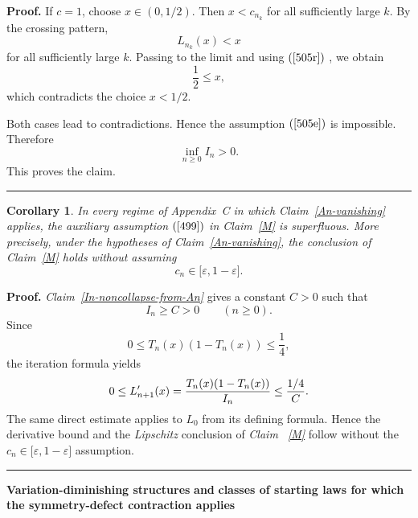\documentclass[onecolumn]{article}
\newtheorem{corollary}[theorem]{Corollary}
\newenvironment{proof}[1][Proof]{\noindent\textbf{#1.} }{\ \rule{0.5em}{0.5em}}
\begin{document}
\begin{proof}
\noindent If $c=1$, choose $x\in (0,1/2)$. Then $x<c_{n_{k}}$ for all
sufficiently large $k$. By the crossing pattern, 
\begin{equation*}
L_{n_{k}}(x)<x
\end{equation*}%
for all sufficiently large $k$. Passing to the limit and using $(\ref{505r})$%
, we obtain 
\begin{equation*}
\frac{1}{2}\leq x,
\end{equation*}%
which contradicts the choice $x<1/2$.

Both cases lead to contradictions. Hence the assumption $(\ref{505e})$ is
impossible. Therefore 
\begin{equation*}
\inf_{n\geq 0}I_{n}>0.
\end{equation*}%
This proves the claim. \hfill
\end{proof}

\begin{corollary}
\textbf{\label{M-unconditional-under-An} }In every regime of Appendix~C in
which Claim~\ref{An-vanishing} applies, the auxiliary assumption $(\ref{499}%
) $ in Claim~\ref{M} is superfluous. More precisely, under the hypotheses of
Claim~\ref{An-vanishing}, the conclusion of Claim~\ref{M} holds without
assuming 
\begin{equation*}
c_{n}\in \lbrack \varepsilon ,1-\varepsilon ].
\end{equation*}
\end{corollary}

\begin{proof}
\textit{\noindent Claim~\ref{In-noncollapse-from-An}} gives a constant $C>0$
such that 
\begin{equation*}
I_{n}\geq C>0\qquad (n\geq 0).
\end{equation*}%
Since 
\begin{equation*}
0\leq T_{n}(x)(1-T_{n}(x))\leq \frac{1}{4},
\end{equation*}%
the iteration formula yields 
\begin{equation*}
0\leq L_{n+1}^{\prime }(x)=\frac{T_{n}(x)(1-T_{n}(x))}{I_{n}}\leq \frac{1/4}{%
C}.
\end{equation*}%
The same direct estimate applies to $L_{0}$ from its defining formula. Hence
the derivative bound and the \textit{Lipschitz} conclusion of \textit{Claim~%
\ref{M}} follow without the $c_{n}\in \lbrack \varepsilon ,1-\varepsilon ]$
assumption. \hfill
\end{proof}

\begin{flushleft}
\textbf{Variation-diminishing structures} \textbf{and} \textbf{classes of
starting laws for which the symmetry-defect contraction applies}
\end{flushleft}
\end{document}

